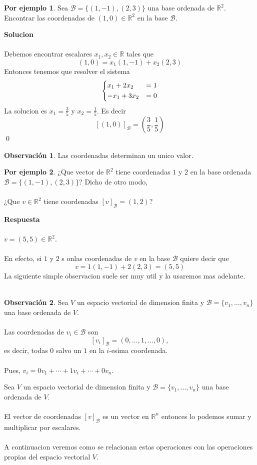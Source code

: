 \documentclass{article}
\theoremstyle{definition}
\theoremstyle{definition}
\newtheorem*{obs}{Observación}
\newtheorem*{ej}{Por ejemplo}
\theoremstyle{remark}
\begin{document}
\begin{ej}
  Sea $\mathcal{B}=\{(1,-1),(2,3)\}$ una base ordenada de $\mathbb{R}^2$. Encontrar las coordenadas de $(1,0) \in \mathbb{R}^2$ en la base $\mathcal{B}$.
\end{ej}
\textbf{Solucion} \\\\ Debemos encontrar escalares $x_1, x_2 \in \mathbb{R}$ tales que \[
  (1,0)=x_1(1,-1)+x_2(2,3)
\]
Entonces tenemos que resolver el sistema \[
  \begin{dcases}
    x_1+2x_2 & = 1 \\
    -x_1+3x_2 & = 0
  \end{dcases}
\]
La solucion es $x_1=\frac{3}{5}$ y $x_2 = \frac{1}{5}$. Es decir \[
    [(1,0)]_{\mathcal{B}}=\left(\frac{3}{5},\frac{1}{5}\right)
  \] \qed
  \begin{obs}
    Las coordenadas determinan un unico valor. 
  \end{obs}
  \begin{ej}
    ¿Que vector de $\mathbb{R}^2$ tiene coordenadas $1$ y $2$ en la base ordenada $\mathcal{B}=\{(1,-1),(2,3)\}$? Dicho de otro modo, \\\\¿Que $v \in \mathbb{R}^2$ tiene coordenadas $[v]_\mathcal{B}=(1,2)$?
  \end{ej}
  \textbf{Respuesta} \\\\ $v = (5,5) \in \mathbb{R}^2$. \\\\ En efecto, si $1$ y $2$ s onlas coordenadas de $v$ en la base $\mathcal{B}$ quiere decir que \[
v=1(1,-1)+2(2,3)=(5,5)
  \] La siguiente simple observacion suele ser muy util y la usaremos mas adelante. \\\\ \begin{obs}
  Sea $V$ un espacio vectorial de dimension finita y $\mathcal{B}=\{v_1, \dots ,v_n\}$ una base ordenada de $V$. \\\\ Las coordenadas de $v_i\in \mathcal{B}$ son \[
    [v_i]_\mathcal{B}=(0,\dots ,1,\dots ,0),
  \]
  es decir, todas $0$ salvo un $1$ en la $i$-esima coordenada. \\\\ Pues, $v_i=0v_1+\cdots +1v_i+\cdots + 0v_n$.
  \end{obs}
  Sea $V$ un espacio vectorial de dimension finita y $\mathcal{B}=\{v_1, \dots ,v_n\}$ una base ordenada de $V$. \\\\ El vector de coordenadas $[v]_\mathcal{B}$ es un vector en $\mathbb{R}^n$ entonces lo podemos sumar y multiplicar por escalares. \\\\ A continuacion veremos como se relacionan estas operaciones con las operaciones propias del espacio vectorial $V$.
\end{document}
